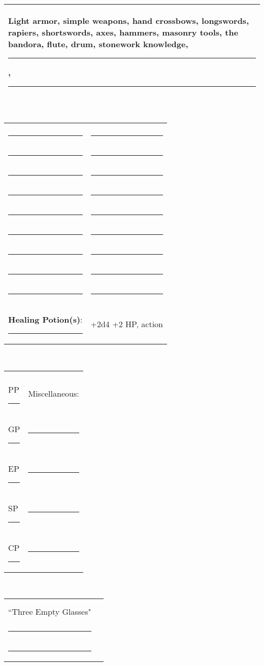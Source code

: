 \documentclass{article}
\begin{document}
\begin{multicols}{2}
\\
\noindent\begin{tabular}{|m{3.1in}|}
\hline
Light armor, simple weapons, hand crossbows, longswords, rapiers, shortswords, axes, hammers, masonry tools,
the bandora, flute, drum, stonework knowledge, \rule{1in}{.2pt}, \rule{1in}{.2pt}\\
\hline
\end{tabular}
\vspace{12pt}

\\
\noindent\begin{tabular}{|ll|}
\hline&\\
\rule{1.4in}{.2pt}&\rule{1.4in}{.2pt}\\
\rule{1.4in}{.2pt}&\rule{1.4in}{.2pt}\\
\rule{1.4in}{.2pt}&\rule{1.4in}{.2pt}\\
\rule{1.4in}{.2pt}&\rule{1.4in}{.2pt}\\
\rule{1.4in}{.2pt}&\rule{1.4in}{.2pt}\\
\rule{1.4in}{.2pt}&\rule{1.4in}{.2pt}\\
\rule{1.4in}{.2pt}&\rule{1.4in}{.2pt}\\
\rule{1.4in}{.2pt}&\rule{1.4in}{.2pt}\\
\rule{1.4in}{.2pt}&\rule{1.4in}{.2pt}\\
\textbf{Healing Potion(s)}: \rule{.2in}{.2pt}& +2d4 +2 HP, {\sc action}\\
\hline
\end{tabular}
\vspace{12pt}


\\
\noindent\begin{tabular}{|ll|}
\hline&\\
PP \rule{.5in}{.2pt} &Miscellaneous:\\
GP \rule{.5in}{.2pt} &\rule{2.2in}{.2pt}\\
EP \rule{.5in}{.2pt} &\rule{2.2in}{.2pt}\\
SP \rule{.5in}{.2pt} &\rule{2.2in}{.2pt}\\
CP \rule{.5in}{.2pt} &\rule{2.2in}{.2pt}\\
\hline
\end{tabular}
\vspace{12pt}

\\
\noindent\begin{tabular}{|ll|}
\hline&\\
``Three Empty Glasses"&\rule{1.5in}{.2pt}\\
\rule{1.45in}{.2pt}&\rule{1.5in}{.2pt}\\
\rule{1.45in}{.2pt}&\rule{1.5in}{.2pt}\\
\hline
\end{tabular}


\end{multicols}
\end{document}
